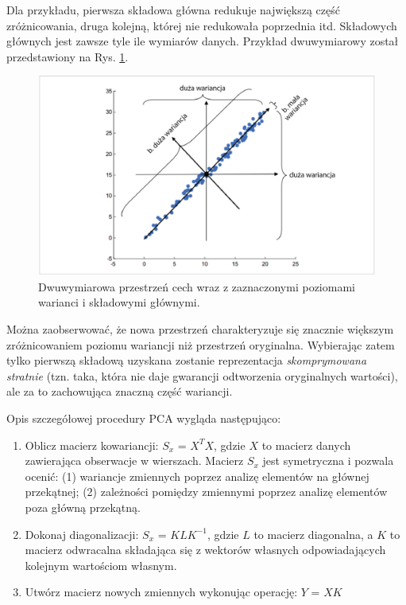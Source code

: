 Dla przykładu, pierwsza składowa główna redukuje największą część zróżnicowania, druga kolejną, której nie redukowała poprzednia itd. Składowych głównych jest zawsze tyle ile wymiarów danych. Przykład dwuwymiarowy został przedstawiony na Rys. \ref{PCA-2dim}.
\begin{figure}[h!]
	\centering
	\includegraphics[width=1\textwidth]{figures/PCA.png}
	\caption{Dwuwymiarowa przestrzeń cech wraz z zaznaczonymi poziomami warianci i składowymi głównymi.}
	\label{PCA-2dim}
\end{figure}
Można zaobserwować, że nowa przestrzeń charakteryzuje się znacznie większym zróżnicowaniem poziomu wariancji niż przestrzeń oryginalna. Wybierając zatem tylko pierwszą składową uzyskana zostanie reprezentacja \textit{skomprymowana stratnie} (tzn. taka, która nie daje gwarancji odtworzenia oryginalnych wartości), ale za to zachowująca znaczną część wariancji.

Opis szczegółowej procedury PCA wygląda następująco:
\begin{enumerate}
\item Oblicz macierz kowariancji: $S_x$ = $X^{T}X$, gdzie $X$ to macierz danych zawierająca obserwacje w wierszach. Macierz $S_x$ jest symetryczna i pozwala ocenić: (1) wariancje zmiennych poprzez analizę elementów na głównej przekątnej; (2) zależności pomiędzy zmiennymi poprzez analizę elementów poza główną przekątną. 
\item Dokonaj diagonalizacji: $S_x$ = $KLK^{-1}$, gdzie $L$ to macierz diagonalna, a $K$ to macierz odwracalna składająca się z wektorów własnych odpowiadających kolejnym wartościom własnym.
\item Utwórz macierz nowych zmiennych wykonując operację: $Y$ = $XK$
\end{enumerate}


